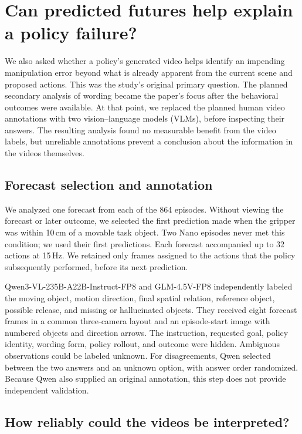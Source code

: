 \documentclass{article}
\begin{document}
\clearpage
\section{Can predicted futures help explain a policy failure?}
\label{app:forecasts}
\suppressfloats[t]

We also asked whether a policy's generated video helps identify an impending manipulation error beyond what is already apparent from the current scene and proposed actions. This was the study's original primary question. The planned secondary analysis of wording became the paper's focus after the behavioral outcomes were available. At that point, we replaced the planned human video annotations with two vision--language models (VLMs), before inspecting their answers. The resulting analysis found no measurable benefit from the video labels, but unreliable annotations prevent a conclusion about the information in the videos themselves.

\subsection{Forecast selection and annotation}

We analyzed one forecast from each of the 864 episodes. Without viewing the forecast or later outcome, we selected the first prediction made when the gripper was within 10\,cm of a movable task object. Two Nano episodes never met this condition; we used their first predictions. Each forecast accompanied up to 32 actions at 15\,Hz. We retained only frames assigned to the actions that the policy subsequently performed, before its next prediction.

Qwen3-VL-235B-A22B-Instruct-FP8 and GLM-4.5V-FP8 independently labeled the moving object, motion direction, final spatial relation, reference object, possible release, and missing or hallucinated objects. They received eight forecast frames in a common three-camera layout and an episode-start image with numbered objects and direction arrows. The instruction, requested goal, policy identity, wording form, policy rollout, and outcome were hidden. Ambiguous observations could be labeled unknown. For disagreements, Qwen selected between the two answers and an unknown option, with answer order randomized. Because Qwen also supplied an original annotation, this step does not provide independent validation.

\subsection{How reliably could the videos be interpreted?}
\end{document}

